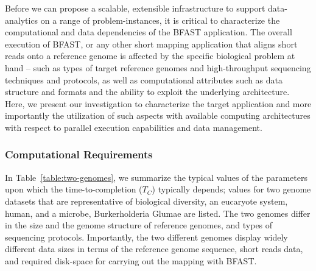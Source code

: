 \documentclass{sig-alternate}
\begin{document}

Before we can propose a scalable, extensible infrastructure to support
data-analytics on a range of problem-instances, it is critical to
characterize the computational and data dependencies of the BFAST
application.  The overall execution of BFAST, or any other short
mapping application that aligns short reads onto a reference genome is
affected by the specific biological problem at hand -- such as types
of target reference genomes and high-throughput sequencing techniques
and protocols, as well as computational attributes such as data
structure and formats and the ability to exploit the underlying
architecture.  Here, we present our investigation to characterize the
target application and more importantly the utilization of such
aspects with available computing architectures with respect to
parallel execution capabilities and data management.

\subsubsection{Computational Requirements}


In Table~\ref{table:two-genomes}, we summarize the typical values of
the parameters upon which the time-to-completion ($T_C$) typically
depends; values for two genome datasets that are representative of
biological diversity, an eucaryote system, human, and a microbe,
Burkerholderia Glumae\cite{kim2011} are listed. The two genomes differ
in the size and the genome structure of reference genomes, and types
of sequencing protocols.  Importantly, the two different genomes
display widely different data sizes in terms of the reference genome
sequence, short reads data, and required disk-space for carrying out
the mapping with BFAST.
\end{document}
